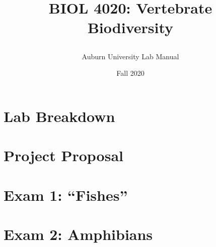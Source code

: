 \documentclass[oneside]{book}
\title{\LARGE{BIOL 4020: Vertebrate Biodiversity}
\author{\Large{Auburn University Lab Manual}
\date{\Large{Fall 2020}}
}}
\begin{document}
\maketitle
\tableofcontents
\chapter{\Huge{Lab Breakdown}}
\chapter{\Huge{Project Proposal}}
\chapter{\Huge{Exam 1: ``Fishes''}}
\chapter{\Huge{Exam 2: Amphibians}}
\end{document}
